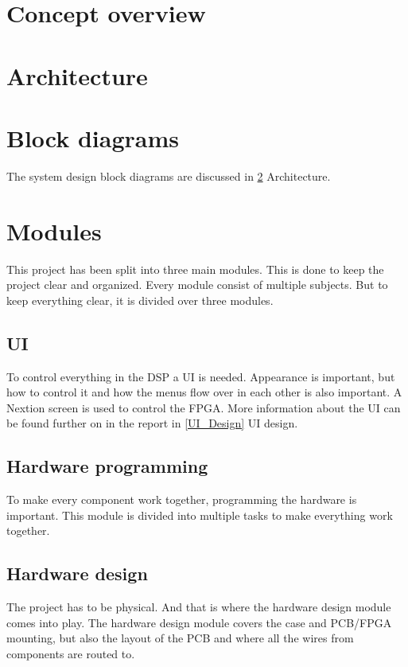 \section{Concept overview}


\section{Architecture} \label{Architecture}


\section{Block diagrams}

The system design block diagrams are discussed in \ref{Architecture} Architecture. 

\section{Modules}

This project has been split into three main modules. This is done to keep the project clear and organized. Every module consist of multiple subjects. But to keep everything clear, it is divided over three modules.

\subsection{UI}
To control everything in the DSP a UI is needed. Appearance is important, but how to control it and how the menus flow over in each other is also important. A Nextion screen is used to control the FPGA. More information about the UI can be found further on in the report in \ref{UI_Design} UI design.

\subsection{Hardware programming}
To make every component work together, programming the hardware is important. This module is divided into multiple tasks to make everything work together.

\subsection{Hardware design}
The project has to be physical. And that is where the hardware design module comes into play. The hardware design module covers the case and PCB/FPGA mounting, but also the layout of the PCB and where all the wires from components are routed to.

